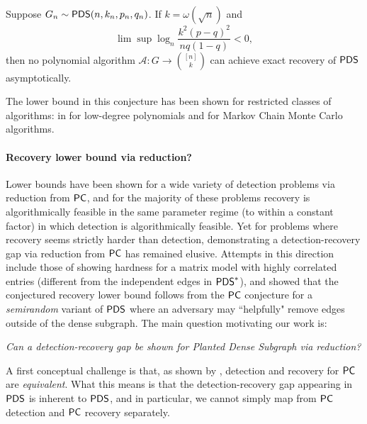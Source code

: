 \documentclass[final,12pt]{colt2023} %
\newcommand\1[1]{\mathbb{I}_{\left\{#1\right\}}}
\begin{document}
\begin{conjecture} \label{conj: rec}
Suppose $G_n\sim \mathsf{PDS}(n, k_n, p_n, q_n)$. If $k=\omega(\sqrt{n})$ and
$$\lim\sup \log_n \frac{k^2(p-q)^2}{nq(1-q)}<0,$$
then no polynomial algorithm $\mathcal{A}: G\to {[n] \choose k}$ can achieve exact recovery of $\mathsf{PDS}$ asymptotically.
\end{conjecture}

The lower bound in this conjecture has been shown for restricted classes of algorithms: in \cite{SchrammWein} for low-degree polynomials and \cite{BWZ20} for Markov Chain Monte Carlo algorithms. 

\paragraph{Recovery lower bound via reduction?} 
Lower bounds have been shown for a wide variety of detection problems via reduction from $\mathsf{PC}$, and for the majority of these problems recovery is algorithmically feasible in the same parameter regime (to within a constant factor) in which detection is algorithmically feasible. Yet for problems where recovery seems strictly harder than detection, demonstrating a detection-recovery gap via reduction from $\mathsf{PC}$ has remained elusive. Attempts in this direction include those of \cite{CLR17} showing hardness for a matrix model with highly correlated entries (different from the independent edges in $\mathsf{PDS}^*$), and  \cite{BB20} showed that the conjectured recovery lower bound follows from the $\mathsf{PC}$ conjecture for a \emph{semirandom} variant of $\mathsf{PDS}$ where an adversary may ``helpfully" remove edges outside of the dense subgraph. The main question motivating our work is: 

\begin{center}\emph{Can a detection-recovery gap be shown for Planted Dense Subgraph via reduction?}
\end{center}

A first conceptual challenge is that, as shown by \cite{Alonred}, detection and recovery for $\mathsf{PC}$ are \emph{equivalent}. What this means is that the detection-recovery gap appearing in $\mathsf{PDS}$ is inherent to $\mathsf{PDS}$, and in particular, we cannot simply map from $\mathsf{PC}$ detection and $\mathsf{PC}$ recovery separately. 
\end{document}
